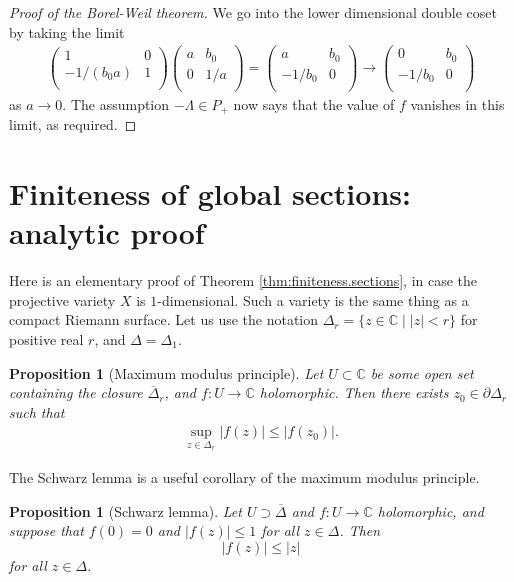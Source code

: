 \documentclass[12pt]{article}
\theoremstyle{plain}
\newtheorem{prop}[thm]{Proposition}
\theoremstyle{definition}
\numberwithin{equation}{section}
\newcommand{\ov}[1]{\overline#1}
\newcommand{\D}{\Delta}
\newcommand{\C}{\mathbb{C}}
\begin{document}
\begin{proof}[Proof of the Borel-Weil theorem]
We go into the lower dimensional double coset by taking the limit
\begin{align*}
\left(\begin{array}{cc}
1 & 0 \\
-1/(b_0a) & 1 \\
\end{array}
\right) \left(\begin{array}{cc}
a & b_0 \\
0 & 1/a \\
\end{array}
\right) =
\left(\begin{array}{cc}
a & b_0 \\
-1/b_0 & 0 \\
\end{array}
\right) \rightarrow \left(\begin{array}{cc}
0 & b_0 \\
-1/b_0 & 0 \\
\end{array}
\right)
\end{align*}
as $a \rightarrow 0$. The assumption $-\Lambda \in P_+$ now says that the value of $f$ vanishes in this limit, as required.
\end{proof}


\section{Finiteness of global sections: analytic proof}


Here is an elementary proof of Theorem \ref{thm:finiteness.sections}, in case the projective variety $X$ is $1$-dimensional. Such a variety is the same thing as a compact Riemann surface. Let us use the notation $\D_r = \{z \in \C \mid |z| < r\}$ for positive real $r$, and $\D = \D_1$.
\begin{prop}[Maximum modulus principle]
Let $U \subset \C$ be some open set containing the closure $\ov{\D}_r$, and $f : U \rightarrow \C$ holomorphic. Then there exists $z_0 \in \partial \D_r$ such that
\begin{align*}
\sup_{z \in \D_r} |f(z)| \leq |f(z_0)|.
\end{align*}
\end{prop}

The Schwarz lemma is a useful corollary of the maximum modulus principle.
\begin{prop}[Schwarz lemma]
Let $U \supset \ov\D$ and $f : U \rightarrow \C$ holomorphic, and suppose that $f(0) = 0$ and $|f(z)| \leq 1$ for all $z \in \D$. Then
\[
|f(z)| \leq |z|
\]
for all $z \in \D$.
\end{prop}
\end{document}
